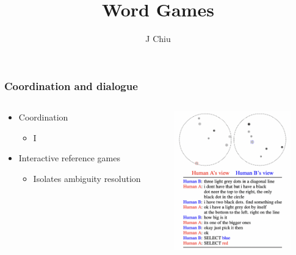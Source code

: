 \documentclass{beamer}
\title{Word Games}
\author{J Chiu}
\begin{document}
\begin{frame}[plain]
\titlepage
\end{frame}

\begin{frame}
\frametitle{Coordination and dialogue}
\begin{columns}
\begin{column}{0.5\textwidth}
\begin{itemize}
\item Coordination
    \begin{itemize}
    \item I
    \end{itemize}
\item Interactive reference games
    \begin{itemize}
    \item Isolates ambiguity resolution
    \end{itemize}
\end{itemize}
\end{column}
\begin{column}{0.5\textwidth}
    \centering
\includegraphics[width=2in]{img/oc.png}
\end{column}
\end{columns}
\end{frame}
\end{document}
